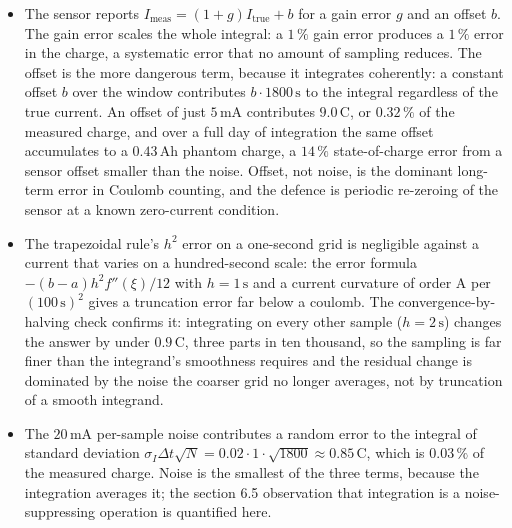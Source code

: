 \begin{itemize}[leftmargin=*]
  \item {} The sensor
    reports $I_{\mathrm{meas}} = (1 + g)I_{\mathrm{true}} + b$ for a
    gain error $g$ and an offset $b$. The gain error scales the whole
    integral: a $1\,\%$ gain error produces a $1\,\%$ error in the
    charge, a systematic error that no amount of sampling reduces.
    The offset is the more dangerous term, because it integrates
    coherently: a constant offset $b$ over the window contributes
    $b\cdot 1800\,\si{\second}$ to the integral regardless of the
    true current. An offset of just $5\,\si{\milli\ampere}$
    contributes $9.0\,\si{\coulomb}$, or $0.32\,\%$ of the measured
    charge, and over a full day of integration the same offset
    accumulates to a $0.43\,\si{\ampere\hour}$ phantom charge, a
    $14\,\%$ state-of-charge error from a sensor offset smaller than
    the noise. Offset, not noise, is the dominant long-term error in
    Coulomb counting, and the defence is periodic re-zeroing of the
    sensor at a known zero-current condition.
  \item {} The trapezoidal rule's
    $h^{2}$ error on a one-second grid is negligible against a current
    that varies on a hundred-second scale: the error formula
    $-(b-a)h^{2}f''(\xi)/12$ with $h = 1\,\si{\second}$ and a current
    curvature of order $\si{\ampere}$ per $(100\,\si{\second})^{2}$
    gives a truncation error far below a coulomb. The convergence-by-
    halving check confirms it: integrating on every other sample
    ($h = 2\,\si{\second}$) changes the answer by under
    $0.9\,\si{\coulomb}$, three parts in ten thousand, so the sampling
    is far finer than the integrand's smoothness requires and the
    residual change is dominated by the noise the coarser grid no
    longer averages, not by truncation of a smooth integrand.
  \item {} The $20\,\si{\milli\ampere}$
    per-sample noise contributes a random error to the integral of
    standard deviation $\sigma_{I}\Delta t\sqrt{N} =
    0.02\cdot 1\cdot\sqrt{1800} \approx 0.85\,\si{\coulomb}$, which is
    $0.03\,\%$ of the measured charge. Noise is the smallest of the
    three terms, because the integration averages it; the section 6.5
    observation that integration is a noise-suppressing operation is
    quantified here.
\end{itemize}

